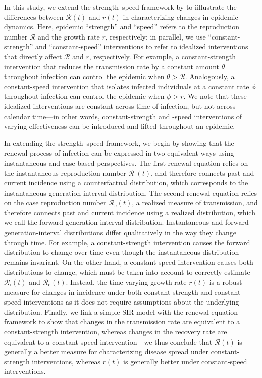 \documentclass[12pt]{article}
\newcommand{\comment}{\showcomment}
\newcommand{\showcomment}[3]{\textcolor{#1}{\textbf{[#2: }\textsl{#3}\textbf{]}}}
\newcommand{\jd}[1]{\comment{cyan}{JD}{#1}}
\newcommand{\swp}[1]{\comment{magenta}{SWP}{#1}}
\newcommand{\Rx}[1]{\ensuremath{{\mathcal R}_{#1}}\xspace}
\newcommand{\Rc}{\Rx{\mathrm{c}}}
\newcommand{\Ri}{\Rx{\mathrm{i}}}
\newcommand{\RR}{\ensuremath{{\mathcal R}}\xspace}
\begin{document}
In this study, we extend the strength--speed framework by \cite{dushoff2021speed} to iillustrate the differences between $\RR(t)$ and $r(t)$ in characterizing changes in epidemic dynamics.
Here, epidemic ``strength'' and ``speed'' refers to the reproduction number $\RR$ and the growth rate $r$, respectively; 
in parallel, we use ``constant-strength'' and ``constant-speed'' interventions to refer to idealized interventions that directly affect $\RR$ and $r$, respectively. 
For example, a constant-strength intervention that reduces the transmission rate by a constant amount $\theta$ throughout infection can control the epidemic when $\theta > \RR$. 
Analogously, a constant-speed intervention that isolates infected individuals at a constant rate $\phi$ throughout infection can control the epidemic when $\phi > r$.
We note that these idealized interventions are constant across time of infection, but not across calendar time---in other words, constant-strength and -speed interventions of varying effectiveness can be introduced and lifted throughout an epidemic.

In extending the strength--speed framework, we begin by showing that the renewal process of infection can be expressed in two equivalent ways using instantaneous and case-based perspectives.
The first renewal equation relies on the instantaneous reproduction number $\Ri(t)$, and therefore connects past and current incidence using a counterfactual distribution, which corresponds to the instantaneous generation-interval distribution.
The second renewal equation relies on the case reproduction number $\Rc(t)$, a realized measure of transmission, and therefore connects past and current incidence using a realized distribution, which we call the forward generation-interval distribution.
Instantaneous and forward generation-interval distributions differ qualitatively in the way they change through time.
For example, a constant-strength intervention causes the forward distribution to change over time even though the instantaneous distribution remains invariant.
On the other hand, a constant-speed intervention causes both distributions to change, which must be taken into account to correctly estimate $\Ri(t)$ and $\Rc(t)$.
Instead, the time-varying growth rate $r(t)$ is a robust measure for changes in incidence under both constant-strength and constant-speed interventions as it does not require assumptions about the underlying distribution.
Finally, we link a simple SIR model with the renewal equation framework to show that changes in the transmission rate are equivalent to a constant-strength intervention, whereas changes in the recovery rate are equivalent to a constant-speed intervention---we thus conclude that $\RR(t)$ is generally a better measure for characterizing disease spread under constant-strength interventions, whereas $r(t)$ is generally better under constant-speed interventions.
\end{document}
